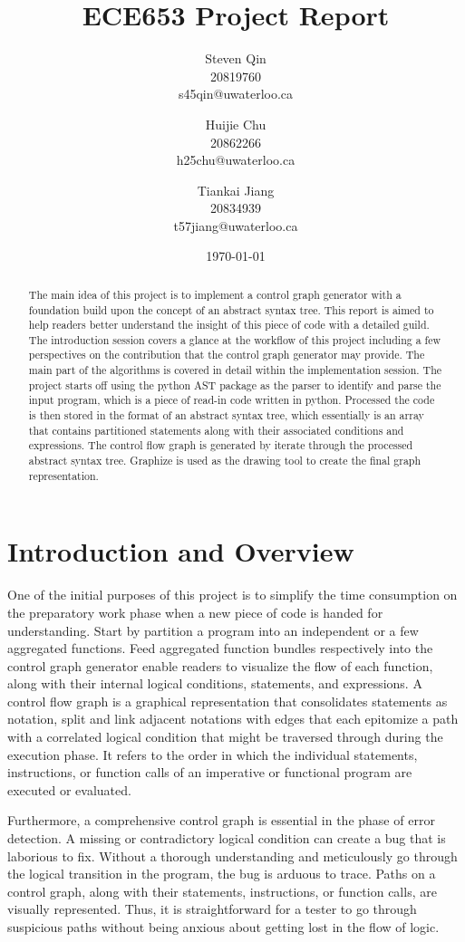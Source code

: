 \documentclass[11pt]{article}
\title{ECE653 Project Report}
\author{Steven Qin\\20819760\\s45qin@uwaterloo.ca \and Huijie Chu\\20862266\\h25chu@uwaterloo.ca \and Tiankai Jiang\\20834939\\t57jiang@uwaterloo.ca}
\date{\today}
\begin{document}
\maketitle

\begin{abstract}
The main idea of this project is to implement a control graph generator with a foundation build upon the concept of an abstract syntax tree. This report is aimed to help readers better understand the insight of this piece of code with a detailed guild. The introduction session covers a glance at the workflow of this project including a few perspectives on the contribution that the control graph generator may provide. The main part of the algorithms is covered in detail within the implementation session. The project starts off using the python AST package as the parser to identify and parse the input program, which is a piece of read-in code written in python. Processed the code is then stored in the format of an abstract syntax tree, which essentially is an array that contains partitioned statements along with their associated conditions and expressions. The control flow graph is generated by iterate through the processed abstract syntax tree. Graphize is used as the drawing tool to create the final graph representation.
\end{abstract}

\section{Introduction and Overview}\label{section-introduction}
One of the initial purposes of this project is to simplify the time consumption on the preparatory work phase when a new piece of code is handed for understanding. Start by partition a program into an independent or a few aggregated functions. Feed aggregated function bundles respectively into the control graph generator enable readers to visualize the flow of each function, along with their internal logical conditions, statements, and expressions. A control flow graph is a graphical representation that consolidates statements as notation, split and link adjacent notations with edges that each epitomize a path with a correlated logical condition that might be traversed through during the execution phase. It refers to the order in which the individual statements, instructions, or function calls of an imperative or functional program are executed or evaluated.

Furthermore, a comprehensive control graph is essential in the phase of error detection. A missing or contradictory logical condition can create a bug that is laborious to fix. Without a thorough understanding and meticulously go through the logical transition in the program, the bug is arduous to trace. Paths on a control graph, along with their statements, instructions, or function calls, are visually represented. Thus, it is straightforward for a tester to go through suspicious paths without being anxious about getting lost in the flow of logic.
\end{document}
